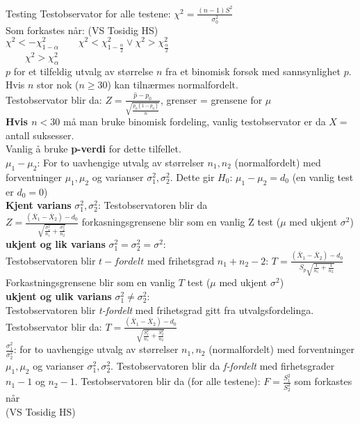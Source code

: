 \documentclass[final,hyperref={pdfpagelabels=false}]{beamer}
\begin{document}
\begin{frame}{}
\begin{columns}[t]
\begin{column}{.25\linewidth}
\begin{block}{\center\normalsize Testing}
{					Testobservator for alle testene: $\chi^2=\frac{(n-1)S^2}{\sigma_0^2}$\\
					Som forkastes når: (VS Tosidig HS)\\
					$\chi^2<-\chi^2_{1-\alpha}\qquad\chi^2<\chi^2_{1-\frac{\alpha}{2}}\vee\chi^2>\chi^2_\frac{\alpha}{2}$\\$ \qquad\chi^2>\chi^2_\alpha$\\
					$p$ for et tilfeldig utvalg av størrelse $n$ fra et binomisk forsøk med sannsynlighet $p$. Hvis $n$ stor nok ($n \geq 30$) kan tilnærmes normalfordelt.\\
					Testobservator blir da: $Z=\frac{\hat p - p_0}{\sqrt{\frac{p_0(1-p_0)}{n}}}$, grenser = grensene for $\mu$\\
					\textbf{Hvis $n<30$} må man bruke binomisk fordeling, vanlig testobservator er da $X=$ antall suksesser.\\
					Vanlig å bruke \textbf{p-verdi} for dette tilfellet.\\
					$\mu_1-\mu_2$: For to uavhengige utvalg av størrelser $n_1,n_2$ (normalfordelt) med forventninger $\mu_1,\mu_2$ og varianser $\sigma^2_1,\sigma_2^2$. Dette gir $H_0$: $\mu_1-\mu_2=d_0$ (en vanlig test er $d_0=0$)\\
					\textbf{Kjent varians} $\sigma_1^2,\sigma_2^2$: Testobservatoren blir da\\
					$Z=\frac{(\bar X_1-\bar X_2)-d_0}{\sqrt{\frac{\sigma_1^2}{n_1}+\frac{\sigma_2^2}{n_2}}}$ forkasningsgrensene blir som en vanlig Z test ($\mu$ med ukjent $\sigma^2$)\\
					\textbf{ukjent og lik varians} $\sigma_1^2=\sigma_2^2=\sigma^2$:\\
					Testobservatoren blir $t-fordelt$ med frihetsgrad $n_1 + n_2-2$:
					$T=\frac{(\bar X_1 - \bar X_2) - d_0}{S_p\sqrt{\frac{1}{n_1}+\frac{1}{n_2}}}$\\
					Forkastningsgrensene blir som en vanlig $T$ test ($\mu$ med ukjent $\sigma^2$)\\
					\textbf{ukjent og ulik varians} $\sigma_1^2\neq\sigma_2^2$:\\
					Testobservatoren blir \textit{t-fordelt} med frihetsgrad gitt fra utvalgsfordelinga. Testobservator blir da:
					$T=\frac{(\bar X_1 - \bar X_2) - d_0}{\sqrt{\frac{S_1^2}{n_1}+\frac{S_2^2}{n_2}}}$\\
					$\frac{\sigma_1^2}{\sigma_2^2}$: for to uavhengige utvalg av størrelser $n_1,n_2$ (normalfordelt) med forventninger $\mu_1,\mu_2$ og varianser $\sigma_1^2,\sigma_2^2$. Testobservatoren blir da \textit{f-fordelt} med firhetsgrader $n_1-1$ og $n_2-1$. Testobservatoren blir da (for alle testene): $F=\frac{S_1^2}{S_2^2}$ som forkastes når \\(VS Tosidig HS)\\
}
\end{block}
\end{column}
\end{columns}
\end{frame}
\end{document}
